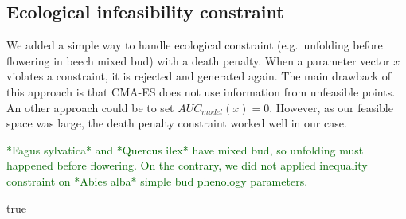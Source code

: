 \documentclass[11pt,]{article}
\begin{document}
\hypertarget{ecological-infeasibility-constraint}{%
\subsection{Ecological infeasibility
constraint}\label{ecological-infeasibility-constraint}}

We added a simple way to handle ecological constraint (e.g.~unfolding
before flowering in beech mixed bud) with a death penalty. When a
parameter vector \(x\) violates a constraint, it is rejected and
generated again. The main drawback of this approach is that CMA-ES does
not use information from unfeasible points. An other approach could be
to set \(AUC_{model}(x)=0\). However, as our feasible space was large,
the death penalty constraint worked well in our case.

\textcolor{darkgreen}{*Fagus sylvatica* and *Quercus ilex* have mixed bud, so unfolding must happened before flowering. On the contrary, we did not applied inequality constraint on *Abies alba* simple bud phenology parameters.}





\newpage
\singlespacing
true
\end{document}
